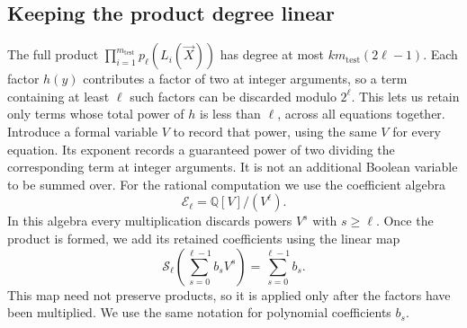 \subsection{Keeping the product degree linear}\label{subsec:total-order}
The full product $\prod_{i=1}^{m_{\mathrm{test}}} p_\ell(L_i(\vec{X}))$ has degree at most
$km_{\mathrm{test}}(2\ell-1)$. Each factor $h(y)$ contributes a factor of two at
integer arguments, so a term containing at least $\ell$ such factors
can be discarded modulo $2^\ell$. This lets us retain only terms
whose total power of $h$ is less than $\ell$, across all equations together.
Introduce a formal variable $V$ to record that power, using the same
$V$ for every equation. Its exponent records a guaranteed power of two
dividing the corresponding term at integer arguments. It is not an
additional Boolean variable to be summed over.
For the rational computation we use the coefficient algebra
\[
 \mathcal E_\ell=\mathbb Q[V]/(V^\ell).
\]
In this algebra every multiplication discards powers $V^s$ with
$s\ge\ell$. Once the product is formed, we add its retained
coefficients using the linear map
\[
 \mathcal S_\ell\!\left(\sum_{s=0}^{\ell-1}b_sV^s\right)
 =\sum_{s=0}^{\ell-1}b_s .
\]
This map need not preserve products, so it is applied only after the
factors have been multiplied. We use the same notation for polynomial
coefficients $b_s$.

